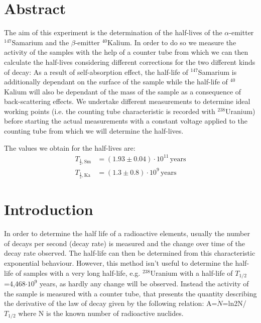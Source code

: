 \documentclass[12pt]{article}
\title{\vspace{0cm}{\Huge Fortgeschrittenen-Praktikum I:\\ \vspace{1cm} LHWZ}}
\author{Saskia Bondza\\Simon Stephan}
\date{Durchgeführt am 02.09.2016 und 05.09.2016}
\begin{document}
\maketitle
\newpage

\section*{Abstract}
The aim of this experiment is the determination of the half-lives of the $\alpha$-emitter ${}^{147}$Samarium and the $\beta$-emitter ${}^{40}$Kalium.
In order to do so we measure the activity of the samples with the help of a counter tube from which we can then calculate the half-lives considering different corrections for the two different kinds of decay: As a result of self-absorption effect, the half-life of ${}^{147}$Samarium is additionally dependant on the surface of the sample while the half-life of ${}^{40}$Kalium will also be dependant of the mass of the sample as a consequence of back-scattering effects.
We undertake different measurements to determine ideal working points (i.e. the counting tube characteristic is recorded with ${}^{238}$Uranium) before starting the actual measurements with a constant voltage applied to the counting tube from which we will determine the half-lives. 


The values we obtain for the half-lives are:
\begin{align*}
T_{\frac12,\text{Sm}}&=\left(1.93\pm0.04\right)\cdot10^{11}\,\text{years}\\
T_{\frac12,\text{Ka}}&=\left(1.3 \pm0.8 \right)\cdot10^{9} \,\text{years}
\end{align*}

\newpage

\thispagestyle{empty}
\tableofcontents
\newpage

\section{Introduction}
In order to determine the half life of a radioactive elements, usually the number of decays per second (decay rate) is measured and the change over time of the decay rate observed. The half-life can then be determined from this characteristic exponential behaviour. However, this method isn't useful to determine the half-life of samples with a very long half-life, e.g. ${}^{238}$Uranium with a half-life of $T_{1/2}$=4,468$\cdot 10^9$ years, as hardly any change will be observed. Instead the activity of the sample is measured with a counter tube, that presents the quantity describing the derivative of the law of decay given by the following relation: A=$\dot{N}$=ln2N/$T_{1/2}$ where N is the known number of radioactive nuclides.
\end{document}
